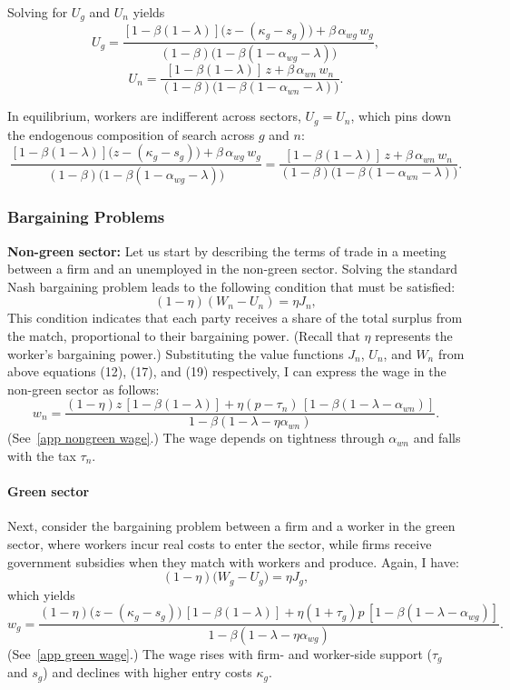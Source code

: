 \documentclass[preprint,12pt]{elsarticle}
\begin{document}
Solving for $U_g$ and $U_n$ yields
\[
U_g=\frac{[1-\beta(1-\lambda)]\big(z-(\kappa_g-s_g)\big)+\beta\,\alpha_{wg}\,w_g}{(1-\beta)\big(1-\beta(1-\alpha_{wg}-\lambda)\big)},
\]
\[
U_n=\frac{[1-\beta(1-\lambda)]\,z+\beta\,\alpha_{wn}\,w_n}{(1-\beta)\big(1-\beta(1-\alpha_{wn}-\lambda)\big)}.
\]

In equilibrium, workers are indifferent across sectors, $U_g = U_n$, which pins down the endogenous composition of search across $g$ and $n$:
\begin{equation}
\frac{[1-\beta(1-\lambda)]\big(z-(\kappa_g-s_g)\big) + \beta\, \alpha_{wg}\, w_g}{(1-\beta)\big(1-\beta(1-\alpha_{wg}-\lambda)\big)}
=
\frac{[1-\beta(1-\lambda)]\,z + \beta\, \alpha_{wn}\, w_n}{(1-\beta)\big(1-\beta(1-\alpha_{wn}-\lambda)\big)}.
\label{eq optimal entry}
\end{equation}

\subsubsection{Bargaining Problems}

\noindent \textbf{Non-green sector:} Let us start by describing the terms of trade in a meeting between a firm and an unemployed in the non-green sector. Solving the standard Nash bargaining problem leads to the following condition that must be satisfied:
\begin{equation}
(1-\eta)(W_n-U_n) = \eta J_n,
\end{equation}
This condition indicates that each party receives a share of the total surplus from the match, proportional to their bargaining power. (Recall that $\eta$ represents the worker’s bargaining power.) Substituting the value functions \( J_n \), \( U_n \), and \( W_n \) from above equations (12), (17), and (19) respectively, I can express the wage in the non-green sector as follows:
\begin{equation}
w_n=\frac{(1-\eta)z\,[1-\beta(1-\lambda)]+\eta(p-\tau_n)\,[1-\beta(1-\lambda-\alpha_{wn})]}{1-\beta(1-\lambda-\eta\alpha_{wn})}.
\label{eq wage nongreen}
\end{equation}
(See~\ref{app nongreen wage}.) The wage depends on tightness through $\alpha_{wn}$ and falls with the tax $\tau_n$.

\paragraph{Green sector}
Next, consider the bargaining problem between a firm and a worker in the green sector, where workers incur real costs to enter the sector, while firms receive government subsidies when they match with workers and produce. Again, I have:
\[
(1-\eta)\big(W_g-U_g\big)=\eta J_g,
\]
which yields
\begin{equation}
w_g=\frac{(1-\eta)\big(z-(\kappa_g-s_g)\big)\,[1-\beta(1-\lambda)]+\eta(1+\tau_g)p\,[1-\beta(1-\lambda-\alpha_{wg})]}{1-\beta(1-\lambda-\eta\alpha_{wg})}.
\label{eq wage green}
\end{equation}
(See~\ref{app green wage}.) The wage rises with firm- and worker-side support ($\tau_g$ and $s_g$) and declines with higher entry costs $\kappa_g$.
\end{document}
